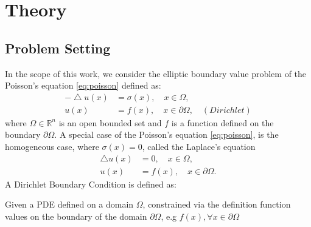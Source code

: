 \chapter{Theory}
\label{chapter:Theory}
%

\section{Problem Setting}
In the scope of this work, we consider the elliptic boundary value problem of
the Poisson's equation
\eqref{eq:poisson} defined as:
  \begin{equation}
    \begin{aligned}
  - \bigtriangleup u(x) &= \sigma(x),\quad x \in \Omega,
  \label{eq:poisson}
  \\ u(x) &= f(x),  \quad x \in \partial \Omega, \quad (Dirichlet)
\end{aligned}
\end{equation}
where $\Omega \in \mathbb{R}^{n}$ is an open bounded set and $f$ is a function
defined on the boundary $\partial \Omega$.
A special case of the Poisson's equation \eqref{eq:poisson}, is the homogeneous case, where $\sigma(x) = 0$, called
the Laplace's equation
  \begin{equation}
    \begin{aligned}
    \bigtriangleup u(x) &= 0, \quad x \in \Omega,
  \\ u(x) &= f(x),  \quad x \in \partial \Omega\text{.}
    \label{eq:laplace}
  \end{aligned}
  \end{equation}
A Dirichlet Boundary Condition is defined as:
\begin{definition}
Given a \Gls{PDE}
defined on a domain $\Omega$, constrained via the definition function values on the
 boundary of the domain $\partial \Omega$, e.g $f(x), \forall  x \in \partial \Omega$
\end{definition}
